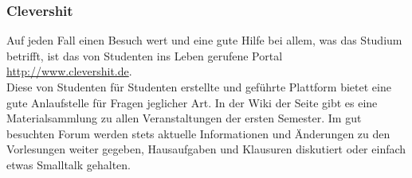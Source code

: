 	\subsubsection{Clevershit}

		Auf jeden Fall einen Besuch wert und eine gute Hilfe bei allem, was das Studium betrifft, ist das von Studenten ins Leben gerufene Portal \mbox{\url{http://www.clevershit.de}}.\\
		Diese von Studenten für Studenten erstellte und geführte Plattform bietet eine gute Anlaufstelle für Fragen jeglicher Art. In der Wiki der Seite gibt es eine Materialsammlung zu allen Veranstaltungen der ersten Semester. Im gut besuchten Forum werden stets aktuelle Informationen und Änderungen zu den Vorlesungen weiter gegeben, Hausaufgaben und Klausuren diskutiert oder einfach etwas Smalltalk gehalten.

%
%
%
%

